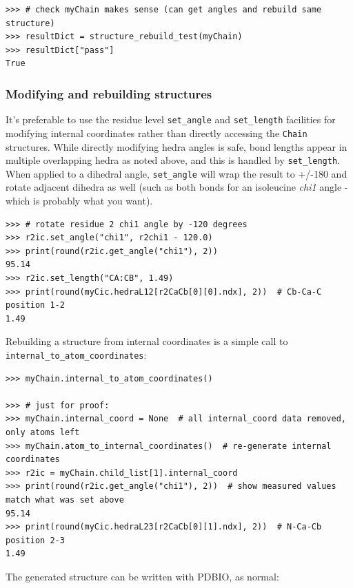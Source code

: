 \begin{verbatim}
>>> # check myChain makes sense (can get angles and rebuild same structure)
>>> resultDict = structure_rebuild_test(myChain)
>>> resultDict["pass"]
True
\end{verbatim}

\subsubsection{Modifying and rebuilding structures}

It's preferable to use the residue level \texttt{set\_angle\(\)} and \texttt{set\_length\(\)}
facilities for modifying internal coordinates rather than directly accessing the \texttt{Chain}
structures.  While directly modifying hedra angles is safe, bond lengths appear in multiple
overlapping hedra as noted above, and this is handled by \texttt{set\_length\(\)}.  When applied
to a dihedral angle, \texttt{set\_angle\(\)} will wrap the result to +/-180 and rotate adjacent
dihedra as well (such as both bonds for an isoleucine \textit{chi1} angle - which is probably
what you want).

\begin{verbatim}
>>> # rotate residue 2 chi1 angle by -120 degrees
>>> r2ic.set_angle("chi1", r2chi1 - 120.0)
>>> print(round(r2ic.get_angle("chi1"), 2))
95.14
>>> r2ic.set_length("CA:CB", 1.49)
>>> print(round(myCic.hedraL12[r2CaCb[0][0].ndx], 2))  # Cb-Ca-C position 1-2
1.49
\end{verbatim}

Rebuilding a structure from internal coordinates is a simple call to \texttt{internal\_to\_atom\_coordinates\(\)}:

\begin{verbatim}
>>> myChain.internal_to_atom_coordinates()

>>> # just for proof:
>>> myChain.internal_coord = None  # all internal_coord data removed, only atoms left
>>> myChain.atom_to_internal_coordinates()  # re-generate internal coordinates
>>> r2ic = myChain.child_list[1].internal_coord
>>> print(round(r2ic.get_angle("chi1"), 2))  # show measured values match what was set above
95.14
>>> print(round(myCic.hedraL23[r2CaCb[0][1].ndx], 2))  # N-Ca-Cb position 2-3
1.49
\end{verbatim}

The generated structure can be written with PDBIO, as normal:

